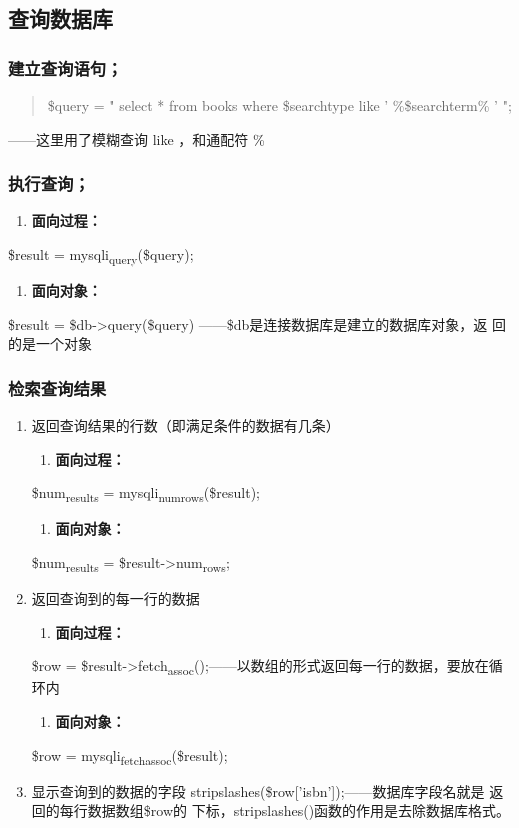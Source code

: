 \documentclass[11pt]{article}
\begin{document}
\subsection{查询数据库}
\label{sec:org47524ce}
\subsubsection{建立查询语句；}
\label{sec:org23779ea}
\begin{quote}
\$query = " select * from books where \$searchtype like ' \%\$searchterm\%
' ";
\end{quote}
——这里用了模糊查询 like ，和通配符 \%
\subsubsection{执行查询；}
\label{sec:orgc6e0240}
\begin{enumerate}
\item \textbf{面向过程：}
\end{enumerate}
\$result = mysqli\textsubscript{query}(\$query);
\begin{enumerate}
\item \textbf{面向对象：}
\end{enumerate}
\$result = \$db->query(\$query)   ——\$db是连接数据库是建立的数据库对象，返
回的是一个对象
\subsubsection{检索查询结果}
\label{sec:orgf15f07b}
\begin{enumerate}
\item 返回查询结果的行数（即满足条件的数据有几条）
\label{sec:org9f391be}
\begin{enumerate}
\item \textbf{面向过程：}
\end{enumerate}
\$num\textsubscript{results} = mysqli\textsubscript{num}\textsubscript{rows}(\$result);
\begin{enumerate}
\item \textbf{面向对象：}
\end{enumerate}
\$num\textsubscript{results} = \$result->num\textsubscript{rows};
\item 返回查询到的每一行的数据
\label{sec:org2a44cbf}
\begin{enumerate}
\item \textbf{面向过程：}
\end{enumerate}
\$row = \$result->fetch\textsubscript{assoc}();——以数组的形式返回每一行的数据，要放在循
环内
\begin{enumerate}
\item \textbf{面向对象：}
\end{enumerate}
\$row = mysqli\textsubscript{fetch}\textsubscript{assoc}(\$result);
\item 显示查询到的数据的字段
\label{sec:org8d4865f}
stripslashes(\$row['isbn']);——数据库字段名就是 返回的每行数据数组\$row的
下标，stripslashes()函数的作用是去除数据库格式。
\end{enumerate}
\end{document}
